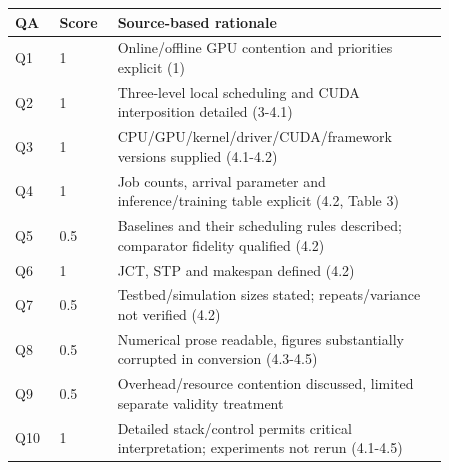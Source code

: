 \begin{longtable}{P{0.09\linewidth}P{0.10\linewidth}P{0.67\linewidth}}
\toprule QA & Score & Source-based rationale\\\midrule\endhead
Q1 & 1 & Online/offline GPU contention and priorities explicit (1)\\
Q2 & 1 & Three-level local scheduling and CUDA interposition detailed (3-4.1)\\
Q3 & 1 & CPU/GPU/kernel/driver/CUDA/framework versions supplied (4.1-4.2)\\
Q4 & 1 & Job counts, arrival parameter and inference/training table explicit (4.2, Table 3)\\
Q5 & 0.5 & Baselines and their scheduling rules described; comparator fidelity qualified (4.2)\\
Q6 & 1 & JCT, STP and makespan defined (4.2)\\
Q7 & 0.5 & Testbed/simulation sizes stated; repeats/variance not verified (4.2)\\
Q8 & 0.5 & Numerical prose readable, figures substantially corrupted in conversion (4.3-4.5)\\
Q9 & 0.5 & Overhead/resource contention discussed, limited separate validity treatment\\
Q10 & 1 & Detailed stack/control permits critical interpretation; experiments not rerun (4.1-4.5)\\
\bottomrule\end{longtable}

